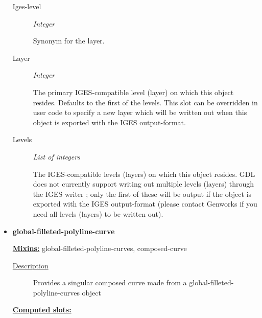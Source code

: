 \documentclass [11pt]{book}
\begin{document}
\begin{itemize}
\begin{description}
\item [Iges-level]
\emph{Integer}

 Synonym for the layer.




\item [Layer]
\emph{Integer}

 The primary IGES-compatible level (layer) on which this object resides. Defaults to the first of the levels. This
slot can be overridden in user code to specify a new layer which will be written out when this object is exported with the IGES
output-format.




\item [Levels]
\emph{List of integers}

 The IGES-compatible levels (layers) on which this object resides. GDL does not currently support writing
out multiple levels (layers) through the IGES writer ; only the first of these will be output if the object is exported with
the IGES output-format (please contact Genworks if you need all levels (layers) to be written out).




\end{description}







\item {}
\label{prim:global-filleted-polyline-curve}
\textbf{global-filleted-polyline-curve}


\textbf{
\underline{Mixins:}} global-filleted-polyline-curves, composed-curve





\begin{description}

\item [
\underline{Description}]


Provides a singular composed curve made 
from a global-filleted-polyline-curves object



\end{description}








\textbf{
\underline{Computed slots:}}


\end{itemize}
\end{document}
